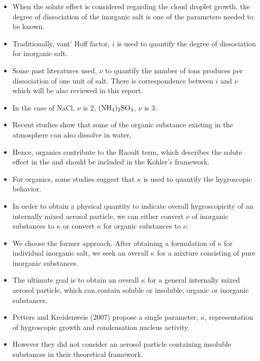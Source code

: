 \documentclass[12pt]{article}
\begin{document}
{\begin{itemize}
\item When the solute effect is considered regarding the cloud droplet growth, the degree of dissociation of the inorganic salt is one of the parameters needed to be known. 

\item Traditionally, vant' Hoff factor, $i$ is used to quantify the degree of dissociation for inorganic salt. 

\item Some past literatures used, $\nu$ to quantify the number of ions produces per dissociation of one unit of salt. There is correspondence between $i$ and $\nu$ which will be also reviewed in this report.

\item  In the case of NaCl, $\nu$ is 2, $\rm (NH_4)_2SO_4$, $\nu$ is 3.

\item Recent studies show that some of the organic substance existing in the atmosphere can also dissolve in water,

\item Hence, organics contribute to the Raoult term, which describes the solute effect in the and should be included in the Kohler's  framework. 

\item For organics, some studies suggest that $\kappa$ is used to quantify the hygroscopic behavior. 


\item In order to obtain a physical quantity to indicate overall hygroscopicity of an internally mixed aerosol particle, we can either convert $\nu$ of inorganic substances to $\kappa$ or convert $\kappa$ for organic substances to $\nu$. 


\item We choose the former approach. After obtaining a formulation of $\kappa$ for individual inorganic salt, we seek an overall $\kappa$ for a mixture consisting of pure inorganic substances. 

\item The ultimate goal is to obtain an overall $\kappa$ for a general internally mixed aerosol particle, which can contain soluble or insoluble; organic or inorganic substances.

\item Petters and Kreidenweis (2007) propose a single parameter, $\kappa$, representation of hygroscopic growth and condensation nucleus activity.

\item However they did not consider an aerosol particle containing insoluble substances in their theoretical framework.


\end{itemize}}
\end{document}
